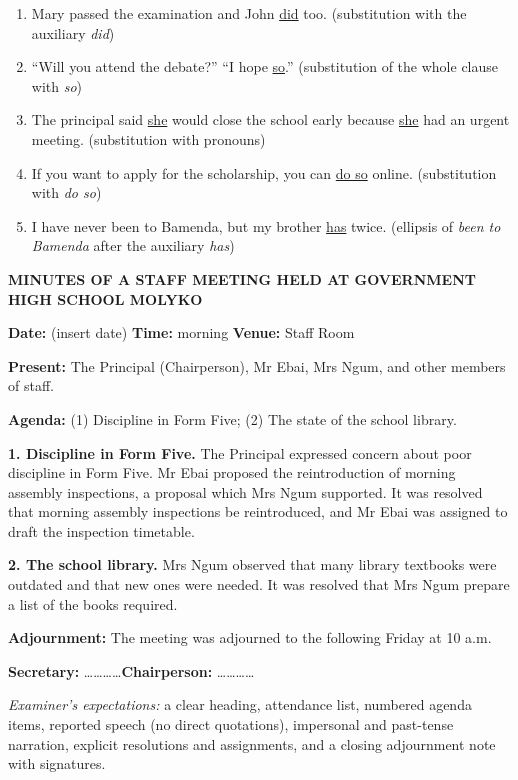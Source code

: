 \documentclass[11pt]{article}
\begin{document}
\begin{corrige}
\begin{enumerate}
\item Mary passed the examination and John \underline{did} too. (substitution with the auxiliary \emph{did})
\item ``Will you attend the debate?'' ``I hope \underline{so}.'' (substitution of the whole clause with \emph{so})
\item The principal said \underline{she} would close the school early because \underline{she} had an urgent meeting. (substitution with pronouns)
\item If you want to apply for the scholarship, you can \underline{do so} online. (substitution with \emph{do so})
\item I have never been to Bamenda, but my brother \underline{has} twice. (ellipsis of \emph{been to Bamenda} after the auxiliary \emph{has})
\end{enumerate}
\end{corrige}

\begin{corrige}
\textbf{MINUTES OF A STAFF MEETING HELD AT GOVERNMENT HIGH SCHOOL MOLYKO}\par
\textbf{Date:} (insert date) \quad \textbf{Time:} morning \quad \textbf{Venue:} Staff Room\par
\textbf{Present:} The Principal (Chairperson), Mr Ebai, Mrs Ngum, and other members of staff.\par
\textbf{Agenda:} (1) Discipline in Form Five; (2) The state of the school library.\par
\textbf{1. Discipline in Form Five.} The Principal expressed concern about poor discipline in Form Five. Mr Ebai proposed the reintroduction of morning assembly inspections, a proposal which Mrs Ngum supported. It was resolved that morning assembly inspections be reintroduced, and Mr Ebai was assigned to draft the inspection timetable.\par
\textbf{2. The school library.} Mrs Ngum observed that many library textbooks were outdated and that new ones were needed. It was resolved that Mrs Ngum prepare a list of the books required.\par
\textbf{Adjournment:} The meeting was adjourned to the following Friday at 10 a.m.\par
\textbf{Secretary:} \ldots\ldots\ldots\ldots \quad \textbf{Chairperson:} \ldots\ldots\ldots\ldots\par
\emph{Examiner's expectations:} a clear heading, attendance list, numbered agenda items, reported speech (no direct quotations), impersonal and past-tense narration, explicit resolutions and assignments, and a closing adjournment note with signatures.
\end{corrige}
\end{document}

